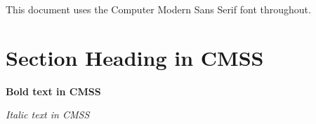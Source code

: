 \documentclass{article}
\begin{document}
This document uses the Computer Modern Sans Serif font throughout.

\section*{Section Heading in CMSS}

\textbf{Bold text in CMSS}

\textit{Italic text in CMSS}
\end{document}
